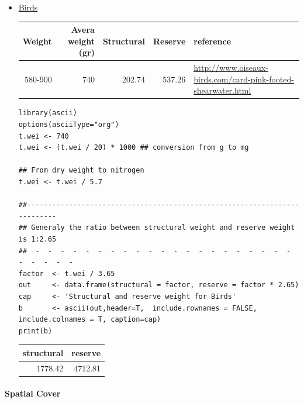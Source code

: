 \documentclass[11pt]{article}
\begin{document}
\begin{itemize}
\begin{itemize}
\item \underline{Birds}

\begin{center}
\begin{tabular}{rrrrl}
  Weight  &  Avera weight (gr)  &  Structural  &  Reserve  &  reference                                                                                                                            \\
\hline
 580-900  &                740  &      202.74  &   537.26  &  \href{http://www.oiseaux-birds.com/card-pink-footed-shearwater.html}{http://www.oiseaux-birds.com/card-pink-footed-shearwater.html}  \\
\end{tabular}
\end{center}




\begin{verbatim}
library(ascii)
options(asciiType="org")
t.wei <- 740
t.wei <- (t.wei / 20) * 1000 ## conversion from g to mg

## From dry weight to nitrogen
t.wei <- t.wei / 5.7

##--------------------------------------------------------------------------
## Generaly the ratio between structural weight and reserve weight is 1:2.65
##  -  -  -  -  -  -  -  -  -  -  -  -  -  -  -  -  -  -  -  -  -  -  -  -  -  -
factor  <- t.wei / 3.65
out     <- data.frame(structural = factor, reserve = factor * 2.65)
cap     <- 'Structural and reserve weight for Birds'
b       <- ascii(out,header=T,  include.rownames = FALSE, include.colnames = T, caption=cap)
print(b)
\end{verbatim}

\begin{center}
\begin{tabular}{rr}
 structural  &  reserve  \\
\hline
    1778.42  &  4712.81  \\
\end{tabular}
\end{center}


\end{itemize}

\end{itemize} %
\paragraph*{Spatial Cover}
\label{sec-5-2-1-7}
\end{document}
